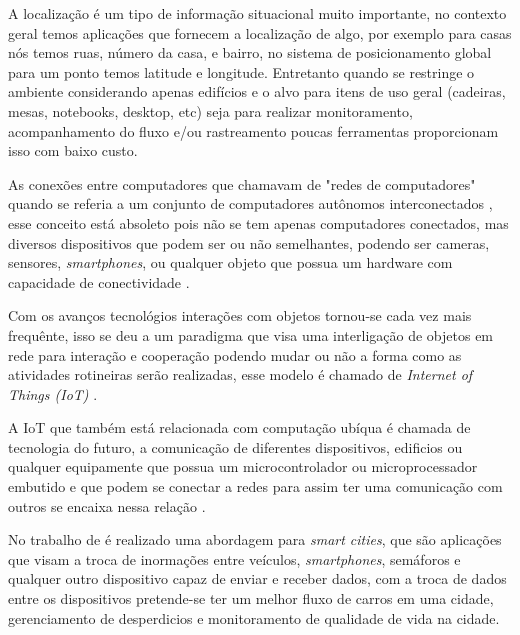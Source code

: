 
A localização é um tipo de informação situacional muito importante, no contexto geral temos aplicações que fornecem a localização de algo, por exemplo para casas nós temos ruas, número da casa, e bairro, no sistema de posicionamento global para um ponto temos  latitude e longitude. Entretanto quando se restringe o ambiente considerando apenas edifícios e o alvo para itens de uso geral (cadeiras, mesas, notebooks, desktop, etc) seja para realizar monitoramento, acompanhamento do fluxo e/ou rastreamento poucas ferramentas proporcionam isso com baixo custo.


As  conexões entre computadores que chamavam de 
"redes de computadores" quando se referia a um conjunto de computadores autônomos interconectados \cite{tenenbaum2002}, 
esse conceito está absoleto pois não se tem apenas computadores conectados, mas diversos dispositivos que podem ser ou 
não semelhantes, podendo ser cameras, sensores, \textit{smartphones}, ou qualquer objeto que possua um 
hardware com capacidade de conectividade \cite{iot2016SBRC}.


Com os avanços tecnológios interações com objetos tornou-se cada vez mais frequênte, isso se deu a um paradigma 
que visa uma interligação de objetos em rede para interação e cooperação podendo mudar ou não a forma como as atividades 
rotineiras serão realizadas, esse modelo é chamado de \textit{Internet of Things (IoT)} \cite{realtimeRFID2016}.


A IoT que também está relacionada com computação ubíqua é chamada de tecnologia do futuro, a comunicação de diferentes dispositivos, 
edificios ou qualquer equipamente que possua um microcontrolador ou microprocessador embutido e que podem se conectar a 
redes para assim ter uma comunicação com outros se encaixa nessa relação \cite{mechanismRFID2006}.


No trabalho de \citeauthor{IotMartins} é realizado uma abordagem para \textit{smart cities}, que são aplicações que visam a troca de inormações entre veículos, \textit{smartphones}, semáforos e qualquer outro dispositivo capaz de enviar e receber dados, com a troca de dados entre os dispositivos pretende-se ter um melhor fluxo de carros em uma cidade, gerenciamento de desperdicios e monitoramento de qualidade de vida na cidade. 


